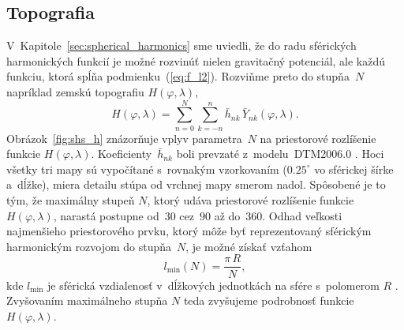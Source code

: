 \documentclass[a4paper,12pt]{book}
\begin{document}
\subsection{Topografia}
\label{sec:sh_applications_topography}

V~Kapitole~\ref{sec:spherical_harmonics} sme uviedli, že do radu sférických
harmonických funkcií je možné rozvinúť nielen gravitačný potenciál, ale každú
funkciu, ktorá spĺňa podmienku~(\ref{eq:f_l2}).  Rozviňme preto do stupňa~$N$ 
napríklad zemskú topografiu $H(\varphi, \lambda)$,
%
\begin{equation}
\label{eq:h_shs}
H(\varphi, \lambda) = \sum_{n = 0}^{N} \sum_{k = -n}^n \bar{h}_{nk} \,
\bar{Y}_{nk}(\varphi, \lambda){.}
\end{equation}
%
Obrázok~\ref{fig:shs_h} znázorňuje vplyv parametra~$N$ na priestorové 
rozlíšenie funkcie $H(\varphi, \lambda)$.  Koeficienty~$\bar{h}_{nk}$ boli 
prevzaté z~modelu~DTM2006.0 \parencite{DTM2006}.  Hoci všetky tri mapy sú 
vypočítané s~rovnakým vzorkovaním ($0.25^{\circ}$ vo sférickej šírke a~dĺžke), 
miera detailu stúpa od vrchnej mapy smerom nadol.  Spôsobené je to tým, že 
maximálny stupeň $N$, ktorý udáva priestorové rozlíšenie funkcie 
$H(\varphi,\lambda)$, narastá postupne od~$30$ cez~$90$ až do~$360$.  Odhad 
veľkosti najmenšieho priestorového prvku, ktorý môže byť reprezentovaný 
sférickým harmonickým rozvojom do stupňa~$N$, je možné získať vzťahom
%
\begin{equation}
l_{\min}(N) = \frac{\pi \, R}{N}{,}
\end{equation}
%
kde $l_{\min}$ je sférická vzdialenosť v~dĺžkových jednotkách na sfére 
s~polomerom $R$ \parencite{Barthelmes2013}.  Zvyšovaním
maximálneho stupňa $N$ teda zvyšujeme podrobnosť funkcie $H(\varphi, \lambda)$.
\end{document}
